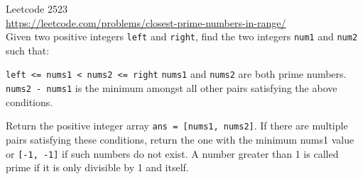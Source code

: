   Leetcode 2523 \\
  \url{https://leetcode.com/problems/closest-prime-numbers-in-range/} \\
  Given two positive integers \verb!left! and \verb!right!, find the two integers \verb!num1! and \verb!num2! such that:
  \begin{enumerate}
  \li \verb!left <= nums1 < nums2 <= right!
  \li \verb!nums1! and \verb!nums2! are both prime numbers.
  \li \verb!nums2 - nums1! is the minimum amongst all other pairs satisfying the above conditions.
  \end{enumerate}
  Return the positive integer array \verb!ans = [nums1, nums2]!.
  If there are multiple pairs satisfying these conditions,
  return the one with the minimum nums1 value or \verb![-1, -1]! if such numbers do not exist.
  A number greater than 1 is called prime if it is only divisible by 1 and itself.

